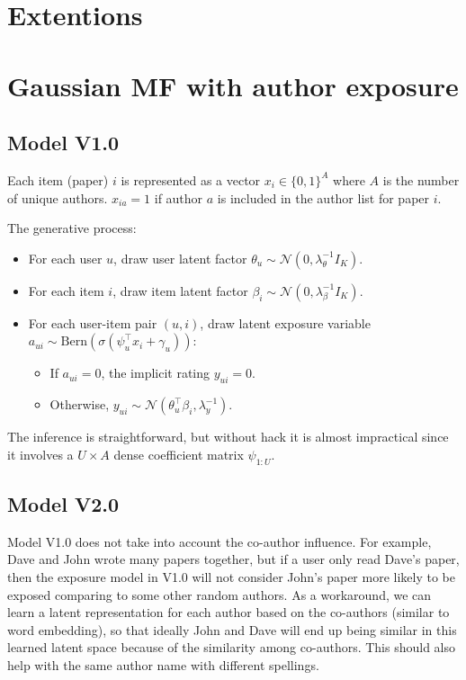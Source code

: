 \section{Extentions}
\section{Gaussian MF with author exposure}
\subsection{Model V1.0}
Each item (paper) $i$ is represented as a vector $x_i \in \{0, 1\}^A$ where $A$ is the number of unique authors. $x_{ia} = 1$ if author $a$ is included in the author list for paper $i$. 

The generative process:
\begin{itemize}
\item For each user $u$, draw user latent factor $\theta_{u} \sim \mathcal{N}(0, \lambda_\theta^{-1} I_K)$.
\item For each item $i$, draw item latent factor $\beta_{i} \sim \mathcal{N}(0, \lambda_\beta^{-1} I_K)$.
\item For each user-item pair $(u, i)$, draw latent exposure variable $a_{ui} \sim \text{Bern}(\sigma(\psi_u^\top x_i + \gamma_u))$:
\begin{itemize}
\item If $a_{ui} = 0$, the implicit rating $y_{ui} = 0$.
\item Otherwise, $y_{ui} \sim \mathcal{N}(\theta_u^\top\beta_i, \lambda_y^{-1})$.
\end{itemize}
\end{itemize}

The inference is straightforward, but without hack it is almost impractical since it involves a $U\times A$ dense coefficient matrix $\psi_{1:U}$.

\subsection{Model V2.0}
Model V1.0 does not take into account the co-author influence. For example, Dave and John wrote many papers together, but if a user only read Dave's paper, then the exposure model in V1.0 will not consider John's paper more likely to be exposed comparing to some other random authors. As a workaround, we can learn a latent representation for each author based on the co-authors (similar to word embedding), so that ideally John and Dave will end up being similar in this learned latent space because of the similarity among co-authors. This should also help with the same author name with different spellings.


